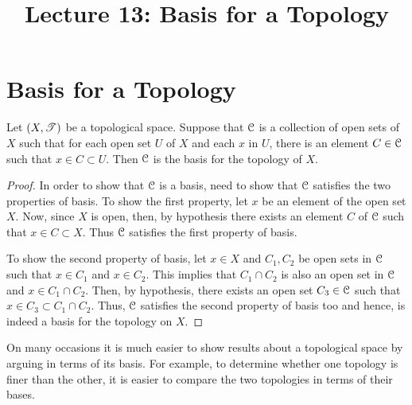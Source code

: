 \documentclass[a4paper,english,12pt]{article}
\begin{document}
\title{Lecture 13: Basis for a Topology}
\author{}
\maketitle


\section{Basis for a Topology}

\begin{lem} \label{basis_alternate_defn_2}
 Let $(X, \mathscr{T})$ be a topological space. Suppose that $\mathcal{C}$ is a collection of open sets of $X$ such that for each open set $U$ of $X$
 and each $x$ in $U$, there is an element $C \in \mathcal{C}$ such that $x \in  C \subset U$. Then $\mathcal{C}$ is the basis for the topology of $X$.
\end{lem}
\begin{proof}
In order to show that $\mathcal{C}$ is a basis, need to show that $\mathcal{C}$ satisfies the two properties of basis. To show the first property, let $x$ be an element of the open 
set $X$. Now, since $X$ is open, then, by hypothesis there exists an element $C$ of $\mathcal{C}$ such that $x \in C \subset X$. Thus $\mathcal{C}$ satisfies the first property of 
basis. 

To show the second property of basis, let $x \in X$ and $C_{1}, C_{2}$ be open sets in $\mathcal{C}$ such that $x \in C_{1}$ and $x \in C_{2}$. This implies that 
$C_{1} \cap C_{2}$ is also an open set in $\mathcal{C}$ and $x \in C_{1} \cap C_{2}$. Then, by hypothesis, there exists an open set $C_{3} \in \mathcal{C}$ such that
$x \in C_{3} \subset C_{1} \cap C_{2}$. Thus, $\mathcal{C}$ satisfies the second property of basis too and hence, is indeed a basis for the topology on $X$.
\end{proof}

On many occasions it is much easier to show results about a topological space by arguing in terms of its basis. For example, to determine whether one 
topology is finer than the other, it is easier to compare the two topologies in terms of their bases.
\end{document}
